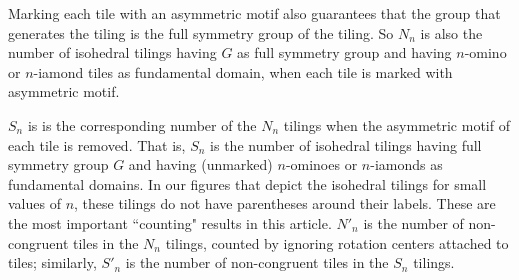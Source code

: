 \documentclass{ws-ijcga}
\begin{document}
Marking each tile with an asymmetric motif also guarantees that the group that generates the
tiling is the full symmetry group of the tiling. 
So $N_n$ is also the number of isohedral tilings
having $G$ as full symmetry group and having $n$-omino or $n$-iamond tiles as fundamental domain,
when each tile is marked with asymmetric motif.

$S_n$ is is the corresponding number of the $N_n$ tilings when the asymmetric motif of each tile is
removed. That is, $S_n$ is the number of isohedral tilings having full symmetry group $G$ and having
(unmarked) $n$-ominoes or $n$-iamonds as fundamental domains. 
In our figures that depict the
isohedral tilings for small values of $n$, these tilings do not have parentheses around their labels. 
These are the most important ``counting" results in this article. 
$N'_n$ is the number of non-congruent
tiles in the $N_n$ tilings, counted by ignoring rotation centers attached to tiles; similarly, 
$S'_n$ is the number of non-congruent tiles in the $S_n$ tilings.
\begin{table}[h]
\label{tbl:p3}
\end{table}
\end{document}

